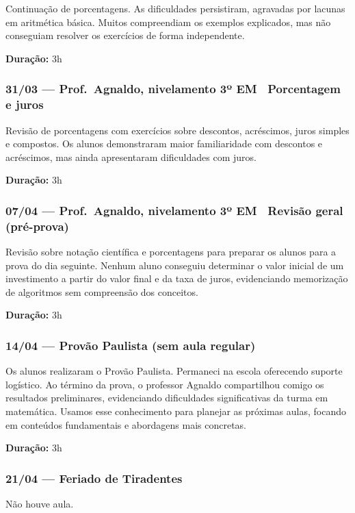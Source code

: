 \documentclass[11pt]{article}
\begin{document}
Continuação de porcentagens. As dificuldades persistiram, agravadas por lacunas em aritmética básica. Muitos compreendiam os exemplos explicados, mas não conseguiam resolver os exercícios de forma independente.

\textbf{Duração:} 3h

\subsubsection*{31/03 --- Prof.\ Agnaldo, nivelamento 3º EM \textbar\ Porcentagem e juros}

Revisão de porcentagens com exercícios sobre descontos, acréscimos, juros simples e compostos. Os alunos demonstraram maior familiaridade com descontos e acréscimos, mas ainda apresentaram dificuldades com juros.

\textbf{Duração:} 3h

\subsubsection*{07/04 --- Prof.\ Agnaldo, nivelamento 3º EM \textbar\ Revisão geral (pré-prova)}

Revisão sobre notação científica e porcentagens para preparar os alunos para a prova do dia seguinte. Nenhum aluno conseguiu determinar o valor inicial de um investimento a partir do valor final e da taxa de juros, evidenciando memorização de algoritmos sem compreensão dos conceitos.

\textbf{Duração:} 3h

\subsubsection*{14/04 --- Provão Paulista (sem aula regular)}

Os alunos realizaram o Provão Paulista. Permaneci na escola oferecendo suporte logístico. Ao término da prova, o professor Agnaldo compartilhou comigo os resultados preliminares, evidenciando dificuldades significativas da turma em matemática. Usamos esse conhecimento para planejar as próximas aulas, focando em conteúdos fundamentais e abordagens mais concretas.

\textbf{Duração:} 3h

\subsubsection*{21/04 --- Feriado de Tiradentes}

Não houve aula.
\end{document}
